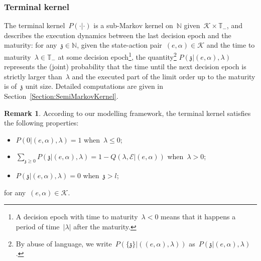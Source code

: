 \documentclass{amsart}[11pt]
\numberwithin{equation}{section}
\theoremstyle{definition}
\newtheorem{remark}[theorem]{Remark}
\newcommand{\NN}{\mathbb{N}}
\newcommand{\Kk}{\mathcal{K}}
\newcommand{\Ee}{\mathcal{E}}
\newcommand{\TT}{\mathbb{T}}
\newcommand{\zz}{\mathfrak{z}}
\begin{document}
\subsubsection{Terminal kernel}
The terminal kernel~$P(\cdot\lvert\cdot)$ 
is a sub-Markov kernel on~$\NN$ given~$\Kk\times\TT_-$,
and describes the execution dynamics between the last decision epoch and the maturity:
for any~$\zz\in\NN$, given the state-action pair~$(e, \alpha)\in \Kk$ and the time to maturity~$\lambda\in\TT_-$ at some decision epoch\footnote{A decision epoch with time to maturity~$\lambda < 0$ means that it happens a period of time~$\lvert\lambda\lvert$ after the maturity.},
the quantity\footnote{By abuse of language,
we write~$P\left(\{\zz\}\lvert\left((e, \alpha), \lambda\right)\right)$ as~$P(\zz\lvert(e, \alpha), \lambda)$.} 
$P(\zz\lvert(e, \alpha), \lambda)$
represents the (joint) probability that the time until the next decision epoch is strictly larger than~$\lambda$ and the executed part of the limit order up to the maturity is of~$\zz$ unit size.
Detailed computations are given in Section~\ref{Section:SemiMarkovKernel}.
\begin{remark}\label{rmk: tk}
According to our modelling framework, the terminal kernel satisfies the following properties:
\begin{itemize}
\item 
$P(0\lvert (e, \alpha), \lambda) = 1$ when~$\lambda\leq 0$;
\item 
$\sum_{\zz \geq 0}P(\zz\lvert (e, \alpha), \lambda) = 1 - Q(\lambda, \Ee\lvert (e, \alpha))$ when~$\lambda>0$;
\item $P(\zz\lvert(e, \alpha), \lambda) = 0$  when~$\zz > l$;
\end{itemize}
for any~$(e, \alpha)\in \Kk$.
\end{remark}

\end{document}
